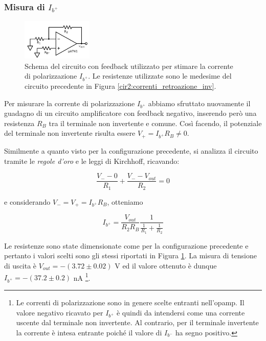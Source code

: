 \subsubsection*{Misura di $I_{b^+}$}

\begin{figure}
  \begin{center}
    \includegraphics[width=0.3\textwidth]{../E02/latex/ninv_current.pdf}
  \end{center}
  \caption{Schema del circuito con feedback utilizzato per stimare la corrente di polarizzazione $I_{b^+}$. Le resistenze utilizzate sono le medesime del circuito precedente in Figura \ref{cir2:correnti_retroazione_inv}.}
  \label{cir2:correnti_retroazione_noninv}
\end{figure}

Per misurare la corrente di polarizzazione $I_{b^+}$ abbiamo sfruttato nuovamente il guadagno di un circuito amplificatore con feedback negativo, inserendo però una resistenza $R_B$ tra il terminale non invertente e comune.
Così facendo, il potenziale del terminale non invertente risulta essere $V_+ = I_{b^+} R_B \not= 0$.

Similmente a quanto visto per la configurazione precedente, si analizza il circuito tramite le \textit{regole d'oro} e le leggi di Kirchhoff, ricavando:

$$\frac{V_- - 0}{R_1} + \frac{V_- - V_{out}}{R_2}=0$$

e considerando $V_- = V_+ = I_{b^+} R_B$, otteniamo

\begin{equation}
I_{b^+}=\frac{V_{out}}{R_2 R_B}\frac{1}{\frac{1}{R_1}+\frac{1}{R_2}}
\label{eq2:corrente_noninv}
\end{equation}

Le resistenze sono state dimensionate come per la configurazione precedente e pertanto i valori scelti sono gli stessi riportati in Figura \ref{cir2:correnti_retroazione_noninv}.
La misura di tensione di uscita è $V_{out} = -(3.72 \pm 0.02)$ \si{\volt} ed il valore ottenuto è dunque $I_{b^+} = - (37.2 \pm 0.2)$ \si{\nano\ampere} \footnote{Le correnti di polarizzazione sono in genere scelte entranti nell'opamp. Il valore negativo ricavato per $I_{b^+}$ è quindi da intendersi come una corrente uscente dal terminale non invertente. Al contrario, per il terminale invertente la corrente è intesa entrante poiché il valore di $I_{b^-}$ ha segno positivo.}.

